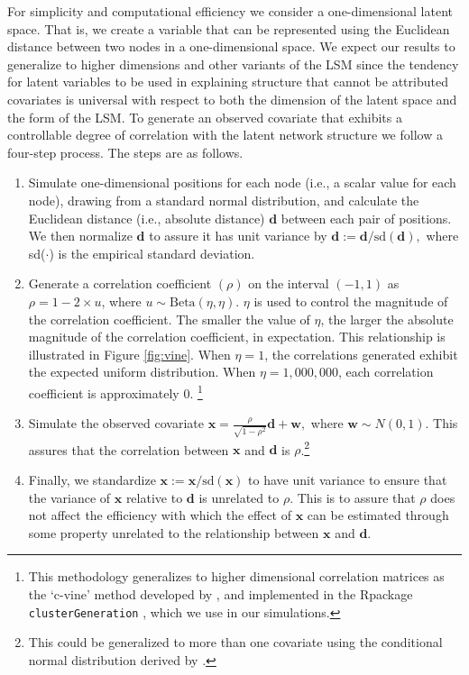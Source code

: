 \documentclass[11pt]{article}
\newcommand{\R}{\textsf{R}\space} %
\begin{document}
For simplicity and computational efficiency we consider a one-dimensional latent space. That is, we create a variable that can be represented using the Euclidean distance between two nodes in a one-dimensional space. We expect our results to generalize to higher dimensions and other variants of the LSM since the tendency for latent variables to be used in explaining structure that cannot be attributed covariates is universal with respect to both the dimension of the latent space and the form of the LSM. To generate an observed covariate that exhibits a controllable degree of correlation with the latent network structure we follow a four-step process. The steps are as follows.
\begin{enumerate}
\item  Simulate one-dimensional positions for each node (i.e., a scalar value for each node), drawing from a standard normal distribution, and calculate the Euclidean distance (i.e., absolute distance) $\mathbf{d}$ between each pair of positions. We then normalize $\mathbf{d}$ to assure it has unit variance by $\mathbf{d} := \mathbf{d}/ \text{sd}(\mathbf{d}),$ where sd($\cdot$) is the empirical standard deviation.


 \item Generate a correlation coefficient $(\rho)$ on the interval $(-1,1)$ as $\rho = 1-2\times u$, where $u \sim  \text{Beta}(\eta,\eta)$. $\eta$ is used to control the magnitude of the correlation coefficient. The smaller the value of $\eta$, the larger the absolute magnitude of the correlation coefficient, in expectation. This relationship is illustrated in Figure \ref{fig:vine}. When $\eta = 1$, the correlations generated exhibit the expected uniform distribution. When $\eta = 1,000,000$, each correlation coefficient is approximately 0. \footnote{This methodology generalizes to higher dimensional correlation matrices as the `c-vine' method developed by \cite{lewandowski2009generating}, and implemented in the \R package \texttt{clusterGeneration} \citep{clusterGeneration}, which we use in our simulations.}

 \item Simulate the observed covariate $\mathbf{x} = \frac{\rho}{\sqrt{1-\rho^2}}\mathbf{d}+\mathbf{w},$ where $\mathbf{w} \sim N(0,1)$. This assures that the correlation between $\mathbf{x}$ and $\mathbf{d}$ is $\rho$.\footnote{This could be generalized to more than one covariate using the conditional normal distribution derived by \cite[pp. 116--117]{eaton1983}.}
 
 \item Finally, we standardize $\mathbf{x} := \mathbf{x}/ \text{sd}(\mathbf{x})$ to have unit variance to ensure that the variance of $\mathbf{x}$ relative to $\mathbf{d}$ is unrelated to $\rho$. This is to assure that $\rho$ does not affect the efficiency with which the effect of $\mathbf{x}$ can be estimated through some property unrelated to the relationship between $\mathbf{x}$ and $\mathbf{d}$.

\end{enumerate} 
\end{document}
